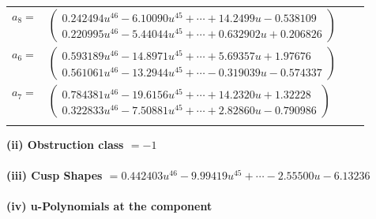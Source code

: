 \documentclass[1p]{elsarticle_modified}
\theoremstyle{definition}
\begin{document}
\begin{tabular}{m{7pt} m{180pt} m{7pt} m{180pt} }
\flushright $a_{8}=$&$\begin{pmatrix}0.242494 u^{46}-6.10090 u^{45}+\cdots+14.2499 u-0.538109\\0.220995 u^{46}-5.44044 u^{45}+\cdots+0.632902 u+0.206826\end{pmatrix}$ \\
\flushright $a_{6}=$&$\begin{pmatrix}0.593189 u^{46}-14.8971 u^{45}+\cdots+5.69357 u+1.97676\\0.561061 u^{46}-13.2944 u^{45}+\cdots-0.319039 u-0.574337\end{pmatrix}$ \\
\flushright $a_{7}=$&$\begin{pmatrix}0.784381 u^{46}-19.6156 u^{45}+\cdots+14.2320 u+1.32228\\0.322833 u^{46}-7.50881 u^{45}+\cdots+2.82860 u-0.790986\end{pmatrix}$\\&\end{tabular}
\flushleft \textbf{(ii) Obstruction class $= -1$}\\~\\
\flushleft \textbf{(iii) Cusp Shapes $= 0.442403 u^{46}-9.99419 u^{45}+\cdots-2.55500 u-6.13236$}\\~\\
\newpage\renewcommand{\arraystretch}{1}
\flushleft \textbf{(iv) u-Polynomials at the component}\newline \\
\end{document}
